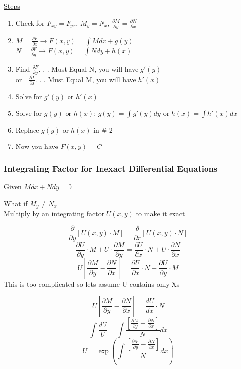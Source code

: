 \documentclass[12pt]{article}
\numberwithin{equation}{subsection}
\newcommand{\parx}[1]{\frac{\partial #1}{\partial x}}
\newcommand{\pary}[1]{\frac{\partial #1}{\partial y}}
\newcommand{\derx}[1]{\frac{d #1}{dx}}
\begin{document}
\underline{Steps}
\begin{enumerate}
\item Check for $F_{xy} = F_{yx}$, $M_y = N_x$, $\pary{M} = \parx{N}$
\item $\displaystyle M=\parx{F} \rightarrow F(x,y)= \int Mdx + g(y)$\\
$\displaystyle N=\pary{F} \rightarrow F(x,y)= \int Ndy + h(x) $
\item Find $\pary{F}$. . . Must Equal N, you will have $g'(y)$\\
or   $\ \ \  \parx{F}$. . . Must Equal M, you will have $h'(x)$
\item Solve for $g'(y)$ or $h'(x)$
\item Solve for $g(y)$ or $h(x)$: $\displaystyle g(y)= \int g'(y) dy$ or $\displaystyle h(x) = \int h'(x) dx$
\item Replace $g(y)$ or $h(x)$ in \# 2
\item Now you have $F(x,y)=C$
\end{enumerate}

\subsubsection{Integrating Factor for Inexact Differential Equations}
Given $Mdx+Ndy=0$

What if $M_y \neq N_x$\\

Multiply by an integrating factor $U(x,y)$ to make it exact

\begin{equation}
\pary{} [U(x,y) \cdot M] = \parx{} [U(x,y) \cdot N]
\end{equation}
\newpage
\begin{equation}
\pary{U} \cdot M + U \cdot \pary{M} = \parx{U} \cdot N + U \cdot \parx{N}
\end{equation}
\begin{equation}
U\left[ \pary{M} - \parx{N}\right]= \parx{U} \cdot N - \pary{U} \cdot M
\end{equation}
This is too complicated so lets assume U contains only Xs

\begin{equation}
U\left[ \pary{M} - \parx{N}\right]= \derx{U} \cdot N 
\end{equation}
\begin{equation}
\int \frac{dU}{U} = \int \frac{\left[ \pary{M} - \parx{N}\right]}{N}dx
\end{equation}
\begin{equation}
U=\exp \left( \int \frac{\left[ \pary{M} - \parx{N}\right]}{N}dx \right)
\end{equation}
\end{document}
